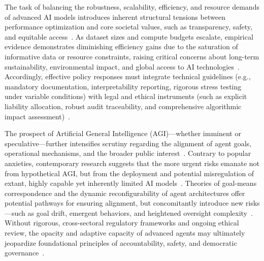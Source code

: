 \documentclass[sigconf]{acmart}
\begin{document}
The task of balancing the robustness, scalability, efficiency, and resource demands of advanced AI models introduces inherent structural tensions between performance optimization and core societal values, such as transparency, safety, and equitable access~\cite{ref27,ref35,ref39,ref46}. As dataset sizes and compute budgets escalate, empirical evidence demonstrates diminishing efficiency gains due to the saturation of informative data or resource constraints, raising critical concerns about long-term sustainability, environmental impact, and global access to AI technologies~\cite{ref27}. Accordingly, effective policy responses must integrate technical guidelines (e.g., mandatory documentation, interpretability reporting, rigorous stress testing under variable conditions) with legal and ethical instruments (such as explicit liability allocation, robust audit traceability, and comprehensive algorithmic impact assessment)~\cite{ref23,ref52,ref53}.

The prospect of Artificial General Intelligence (AGI)—whether imminent or speculative—further intensifies scrutiny regarding the alignment of agent goals, operational mechanisms, and the broader public interest~\cite{ref43,ref49,ref50,ref53}. Contrary to popular anxieties, contemporary research suggests that the more urgent risks emanate not from hypothetical AGI, but from the deployment and potential misregulation of extant, highly capable yet inherently limited AI models~\cite{ref49,ref53}. Theories of goal-means correspondence and the dynamic reconfigurability of agent architectures offer potential pathways for ensuring alignment, but concomitantly introduce new risks—such as goal drift, emergent behaviors, and heightened oversight complexity~\cite{ref50,ref53}. Without rigorous, cross-sectoral regulatory frameworks and ongoing ethical review, the opacity and adaptive capacity of advanced agents may ultimately jeopardize foundational principles of accountability, safety, and democratic governance~\cite{ref52,ref53,ref54,ref55}.
\end{document}
